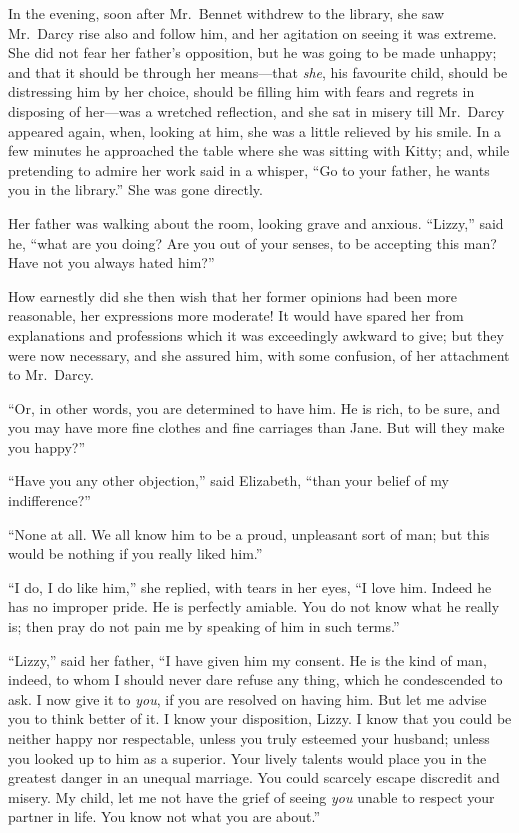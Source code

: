 \documentclass[12pt,english,oneside]{book}
\begin{document}
\bigskip{} In the evening, soon after Mr.\ Bennet withdrew to the
library, she saw Mr.\ Darcy rise also and follow him, and her agitation
on seeing it was extreme. She did not fear her father's opposition,
but he was going to be made unhappy; and that it should be through
her means\mbox{---}that \textit{she}, his favourite child, should
be distressing him by her choice, should be filling him with fears
and regrets in disposing of her\mbox{---}was a wretched reflection,
and she sat in misery till Mr.\ Darcy appeared again, when, looking
at him, she was a little relieved by his smile. In a few minutes he
approached the table where she was sitting with Kitty; and, while
pretending to admire her work said in a whisper, {}``Go to your father,
he wants you in the library.'' She was gone directly.

Her father was walking about the room, looking grave and anxious.
{}``Lizzy,'' said he, {}``what are you doing? Are you out of your
senses, to be accepting this man? Have not you always hated him?''\


How earnestly did she then wish that her former opinions had been
more reasonable, her expressions more moderate! It would have spared
her from explanations and professions which it was exceedingly awkward
to give; but they were now necessary, and she assured him, with some
confusion, of her attachment to Mr.\ Darcy.

{}``Or, in other words, you are determined to have him. He is rich,
to be sure, and you may have more fine clothes and fine carriages
than Jane. But will they make you happy?''\


{}``Have you any other objection,'' said Elizabeth, {}``than your
belief of my indifference?''\


{}``None at all. We all know him to be a proud, unpleasant sort of
man; but this would be nothing if you really liked him.''

{}``I do, I do like him,'' she replied, with tears in her eyes,
{}``I love him. Indeed he has no improper pride. He is perfectly
amiable. You do not know what he really is; then pray do not pain
me by speaking of him in such terms.''

{}``Lizzy,'' said her father, {}``I have given him my consent.
He is the kind of man, indeed, to whom I should never dare refuse
any thing, which he condescended to ask. I now give it to \textit{you},
if you are resolved on having him. But let me advise you to think
better of it. I know your disposition, Lizzy. I know that you could
be neither happy nor respectable, unless you truly esteemed your husband;
unless you looked up to him as a superior. Your lively talents would
place you in the greatest danger in an unequal marriage. You could
scarcely escape discredit and misery. My child, let me not have the
grief of seeing \textit{you} unable to respect your partner in life.
You know not what you are about.''
\end{document}
